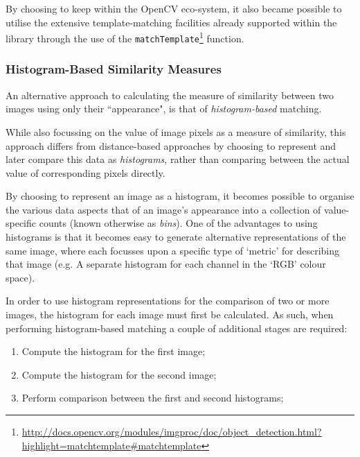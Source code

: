 By choosing to keep within the OpenCV eco-system, it also became possible to utilise the extensive template-matching facilities already supported within the library through the use of the \texttt{matchTemplate}\footnote{\url{http://docs.opencv.org/modules/imgproc/doc/object_detection.html?highlight=matchtemplate#matchtemplate}} function.

%
%

\subsubsection{Histogram-Based Similarity Measures}

An alternative approach to calculating the measure of similarity between two images using only their ``appearance", is that of \textit{histogram-based} matching.

While also focussing on the value of image pixels as a measure of similarity, this approach differs from distance-based approaches by choosing to represent and later compare this data as \textit{histograms}, rather than comparing between the actual value of corresponding pixels directly.

By choosing to represent an image as a histogram, it becomes possible to organise the various data aspects that of an image's appearance into a collection of value-specific counts (known otherwise as \textit{bins}). One of the advantages to using histograms is that it becomes easy to generate alternative representations of the same image, where each focusses upon a specific type of `metric' for describing that image (e.g. A separate histogram for each channel in the `RGB' colour space). 

In order to use histogram representations for the comparison of two or more images, the histogram for each image must first be calculated. As such, when performing histogram-based matching a couple of additional stages are required:

\begin{enumerate}
	\item Compute the histogram for the first image;
	\item Compute the histogram for the second image;
	\item Perform comparison between the first and second histograms;
\end{enumerate}

